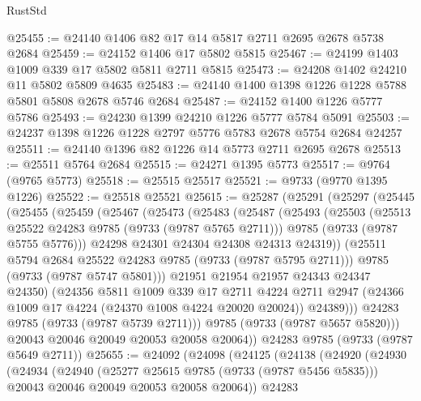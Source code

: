 \begin{lexlean}{RustStd}
\begin{coremodule}
@25455 := @24140 @1406 @82 @17 @14 @5817 @2711 @2695 @2678 @5738 @2684
@25459 := @24152 @1406 @17 @5802 @5815
@25467 := @24199 @1403 @1009 @339 @17 @5802 @5811 @2711 @5815
@25473 := @24208 @1402 @24210 @11 @5802 @5809 @4635
@25483 := @24140 @1400 @1398 @1226 @1228 @5788 @5801 @5808 @2678 @5746 @2684
@25487 := @24152 @1400 @1226 @5777 @5786
@25493 := @24230 @1399 @24210 @1226 @5777 @5784 @5091
@25503 := @24237 @1398 @1226 @1228 @2797 @5776 @5783 @2678 @5754 @2684 @24257
@25511 := @24140 @1396 @82 @1226 @14 @5773 @2711 @2695 @2678
@25513 := @25511 @5764 @2684
@25515 := @24271 @1395 @5773
@25517 := @9764 (@9765 @5773)
@25518 := @25515 @25517
@25521 := @9733 (@9770 @1395 @1226)
@25522 := @25518 @25521
@25615 := @25287
    (@25291
      (@25297
        (@25445
          (@25455
            (@25459
              (@25467
                (@25473
                  (@25483
                    (@25487
                      (@25493
                        (@25503
                          (@25513 @25522 @24283 @9785 (@9733 (@9787 @5765 @2711)))
                          @9785
                          (@9733 (@9787 @5755 @5776)))
                        @24298
                        @24301
                        @24304
                        @24308
                        @24313
                        @24319))
                    (@25511 @5794 @2684 @25522 @24283 @9785 (@9733 (@9787 @5795 @2711)))
                    @9785
                    (@9733 (@9787 @5747 @5801)))
                  @21951
                  @21954
                  @21957
                  @24343
                  @24347
                  @24350)
                (@24356
                  @5811
                  @1009
                  @339
                  @17
                  @2711
                  @4224
                  @2711
                  @2947
                  (@24366 @1009 @17 @4224 (@24370 @1008 @4224 @20020 @20024))
                  @24389)))
            @24283
            @9785
            (@9733 (@9787 @5739 @2711)))
          @9785
          (@9733 (@9787 @5657 @5820)))
        @20043
        @20046
        @20049
        @20053
        @20058
        @20064))
    @24283
    @9785
    (@9733 (@9787 @5649 @2711))
@25655 := @24092
    (@24098
      (@24125
        (@24138
          (@24920
            (@24930
              (@24934
                (@24940
                  (@25277 @25615 @9785 (@9733 (@9787 @5456 @5835)))
                  @20043
                  @20046
                  @20049
                  @20053
                  @20058
                  @20064))
              @24283

\end{coremodule}
\end{lexlean}
